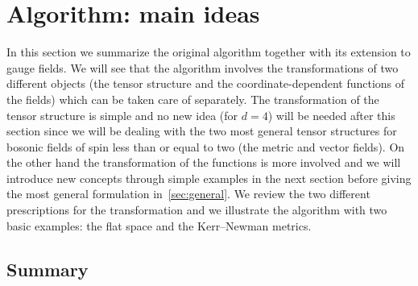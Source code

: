 \section{Algorithm: main ideas}
\label{sec:algo}



In this section we summarize the original algorithm together with its extension to gauge fields.
We will see that the algorithm involves the transformations of two different objects (the tensor structure and the coordinate-dependent functions of the fields) which can be taken care of separately.
The transformation of the tensor structure is simple and no new idea (for $d = 4$) will be needed after this section since we will be dealing with the two most general tensor structures for bosonic fields of spin less than or equal to two (the metric and vector fields).
On the other hand the transformation of the functions is more involved and we will introduce new concepts through simple examples in the next section before giving the most general formulation in~\cref{sec:general}.
We review the two different prescriptions for the transformation and we illustrate the algorithm with two basic examples: the flat space and the Kerr--Newman metrics.


\subsection{Summary}
\label{sec:algo:summary}


